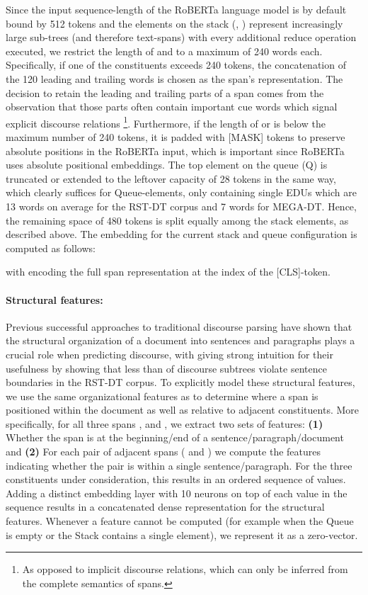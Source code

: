 \documentclass[11pt]{article}
\begin{document}
Since the input sequence-length of the RoBERTa language model is by default bound by 512 tokens and the elements on the stack (, ) represent increasingly large sub-trees (and therefore text-spans) with every additional reduce operation executed, we restrict the length of  and  to a maximum of 240 words each. Specifically, if one of the constituents exceeds 240 tokens, the concatenation of the 120 leading and trailing words is chosen as the span's representation. The decision to retain the leading and trailing parts of a span comes from the observation that those parts often contain important cue words which signal explicit discourse relations \cite{prasadpenn}\footnote{As opposed to implicit discourse relations, which can only be inferred from the complete semantics of spans.}. Furthermore, if the length of  or  is below the maximum number of 240 tokens, it is padded with [MASK] tokens to preserve absolute positions in the RoBERTa input, which is important since RoBERTa uses absolute positional embeddings. 
The top element on the queue (Q) is truncated or extended to the leftover capacity of 28 tokens in the same way, which clearly suffices for Queue-elements, only containing single EDUs which are 13 words on average for the RST-DT corpus and 7 words for MEGA-DT. Hence, the remaining space of 480 tokens is split equally among the stack elements, as described above. The embedding  for the current stack and queue configuration is computed as follows:

with  encoding the full span representation at the index of the [CLS]-token.




\paragraph{Structural features:} Previous successful approaches to traditional discourse parsing \cite{joty2015codra,ji2014representation} have shown that the structural organization of a document into sentences and paragraphs plays a crucial role when predicting discourse, with  giving strong intuition for their usefulness by showing that less than  of discourse subtrees violate sentence boundaries in the RST-DT corpus. To explicitly model these structural features, we use the same organizational features as  
to determine where a span is positioned within the document as well as relative to adjacent constituents. More specifically, for all three spans ,  and , we extract two sets of features: \textbf{(1)} Whether the span is at the beginning/end of a sentence/paragraph/document and \textbf{(2)} For each pair of adjacent spans ( and ) we compute the features indicating whether the pair is within a single sentence/paragraph. 
For the three constituents under consideration, this results in an ordered sequence  of  values. Adding a distinct embedding layer with 10 neurons  on top of each value  in the sequence results in a concatenated dense representation  for the structural features.
Whenever a feature cannot be computed (for example when the Queue is empty or the Stack contains a single element), we represent it as a zero-vector.
\end{document}

